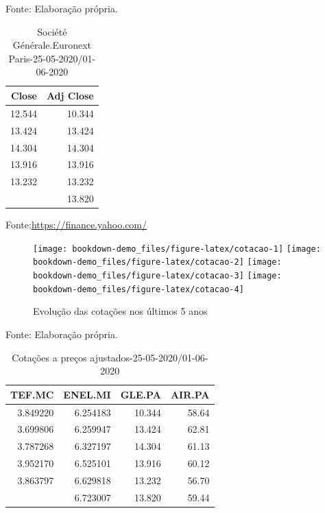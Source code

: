 \documentclass[
  12pt,
  a4paper,
  openany]{book}
\begin{document}
Fonte: Elaboração própria.

\justifying
\bigskip

\begin{table}[!h]

\caption{\label{tab:unnamed-chunk-4}Société Générale.Euronext Paris-25-05-2020/01-06-2020}
\centering
\begin{tabular}[t]{rr}
\toprule
Close & Adj Close\\
\midrule
12.544 & 10.344\\
13.424 & 13.424\\
14.304 & 14.304\\
13.916 & 13.916\\
13.232 & 13.232\\
\addlinespace
13.820 & 13.820\\
\bottomrule
\end{tabular}
\end{table}
\FloatBarrier
\centering

Fonte:\url{https://finance.yahoo.com/}

\justifying
\bigskip

\begin{figure}

{\centering \texttt{[image: bookdown-demo\_files/figure-latex/cotacao-1]} \texttt{[image: bookdown-demo\_files/figure-latex/cotacao-2]} \texttt{[image: bookdown-demo\_files/figure-latex/cotacao-3]} \texttt{[image: bookdown-demo\_files/figure-latex/cotacao-4]} 

}

\caption{Evolução das cotações nos últimos 5 anos}\label{fig:cotacao}
\end{figure}

\FloatBarrier
\centering

Fonte: Elaboração própria.

\justifying
\bigskip

\begin{table}[!h]

\caption{\label{tab:unnamed-chunk-5}Cotações a preços ajustados-25-05-2020/01-06-2020}
\centering
\begin{tabular}[t]{rrrr}
\toprule
TEF.MC & ENEL.MI & GLE.PA & AIR.PA\\
\midrule
3.849220 & 6.254183 & 10.344 & 58.64\\
3.699806 & 6.259947 & 13.424 & 62.81\\
3.787268 & 6.327197 & 14.304 & 61.13\\
3.952170 & 6.525101 & 13.916 & 60.12\\
3.863797 & 6.629818 & 13.232 & 56.70\\
\addlinespace
4.008655 & 6.723007 & 13.820 & 59.44\\
\bottomrule
\end{tabular}
\end{table}
\FloatBarrier
\centering
\end{document}
